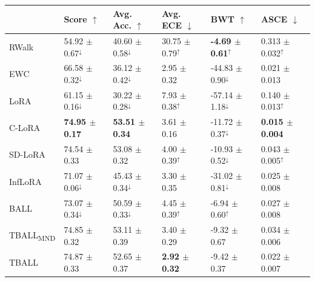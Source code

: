 \begin{tabular}{llllll}
\toprule
 & {\small Score $\uparrow$} & {\small Avg. Acc. $\uparrow$} & {\small Avg. ECE $\downarrow$} & {\small BWT $\uparrow$} & {\small ASCE $\downarrow$} \\
\midrule
RWalk & \small 54.92 $\pm$ 0.67$^{\downarrow}$ & \small 40.60 $\pm$ 0.58$^{\downarrow}$ & \small 30.75 $\pm$ 0.79$^{\uparrow}$ & \small \textbf{-4.69 $\pm$ 0.61}$^{\uparrow}$ & \small 0.313 $\pm$ 0.032$^{\uparrow}$ \\
EWC & \small 66.58 $\pm$ 0.32$^{\downarrow}$ & \small 36.12 $\pm$ 0.42$^{\downarrow}$ & \small 2.95 $\pm$ 0.32 & \small -44.83 $\pm$ 0.90$^{\downarrow}$ & \small 0.021 $\pm$ 0.013 \\
LoRA & \small 61.15 $\pm$ 0.16$^{\downarrow}$ & \small 30.22 $\pm$ 0.28$^{\downarrow}$ & \small 7.93 $\pm$ 0.38$^{\uparrow}$ & \small -57.14 $\pm$ 1.18$^{\downarrow}$ & \small 0.140 $\pm$ 0.013$^{\uparrow}$ \\
C-LoRA & \small \textbf{74.95 $\pm$ 0.17} & \small \textbf{53.51 $\pm$ 0.34} & \small 3.61 $\pm$ 0.16 & \small -11.72 $\pm$ 0.37$^{\downarrow}$ & \small \textbf{0.015 $\pm$ 0.004} \\
SD-LoRA & \small 74.54 $\pm$ 0.33 & \small 53.08 $\pm$ 0.32 & \small 4.00 $\pm$ 0.39$^{\uparrow}$ & \small -10.93 $\pm$ 0.52$^{\downarrow}$ & \small 0.043 $\pm$ 0.005$^{\uparrow}$ \\
InfLoRA & \small 71.07 $\pm$ 0.06$^{\downarrow}$ & \small 45.43 $\pm$ 0.34$^{\downarrow}$ & \small 3.30 $\pm$ 0.35 & \small -31.02 $\pm$ 0.81$^{\downarrow}$ & \small 0.025 $\pm$ 0.008 \\
BALL & \small 73.07 $\pm$ 0.34$^{\downarrow}$ & \small 50.59 $\pm$ 0.33$^{\downarrow}$ & \small 4.45 $\pm$ 0.39$^{\uparrow}$ & \small -6.94 $\pm$ 0.60$^{\uparrow}$ & \small 0.027 $\pm$ 0.008 \\
TBALL\textsubscript{MND} & \small 74.85 $\pm$ 0.32 & \small 53.11 $\pm$ 0.39 & \small 3.40 $\pm$ 0.29 & \small -9.32 $\pm$ 0.67 & \small 0.034 $\pm$ 0.006 \\
TBALL & \small 74.87 $\pm$ 0.33 & \small 52.65 $\pm$ 0.37 & \small \textbf{2.92 $\pm$ 0.32} & \small -9.42 $\pm$ 0.37 & \small 0.022 $\pm$ 0.007 \\
\bottomrule
\end{tabular}
